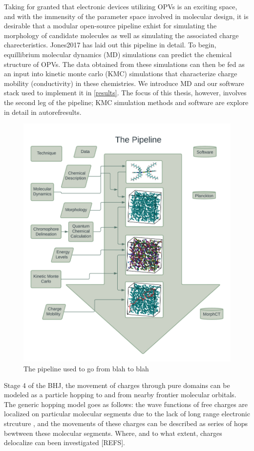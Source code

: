 Taking for granted that electronic devices utilizing OPVs is an exciting
space, and with the immensity of the parameter space involved in molecular design, it is desirable that a modular
open-source pipeline exhist for simulating the morphology of candidate molecules as well as simulating the 
associated charge charecteristics. Jones2017 has laid out this
pipeline in detail. To begin, equillibrium molecular dynamics (MD) simulations can predict the chemical
structure of OPVs. The data obtained from these simulations can then be fed as an input into kinetic monte
carlo (KMC) simulations that characterize charge mobility (conductivity) in these chemistries. We introduce MD
and our software stack used to implement it in \autoref{results}. The focus of this thesis, however, involves
the second leg of the pipeline; KMC simulation methods and software are explore in detail in autoref{results}.
\begin{figure}
  \center
  \includegraphics[width=0.8\linewidth]{figures/the-pipeline.png} 
    \caption{The pipeline used to go from blah to blah}
  \label{pipeline}
\end{figure}

Stage 4 of the BHJ, the movement of charges through pure domains can be modeled as a particle hopping 
to and from nearby frontier molecular orbitals.
The generic hopping model goes as follows: the wave functions of
free charges are localized on particular molecular segments due to the lack of long range electronic strcuture
, and the movements of these charges can be described as series
of hops bewtween these molecular segments. Where, and to what extent, charges delocalize can been investigated
[REFS]. 

